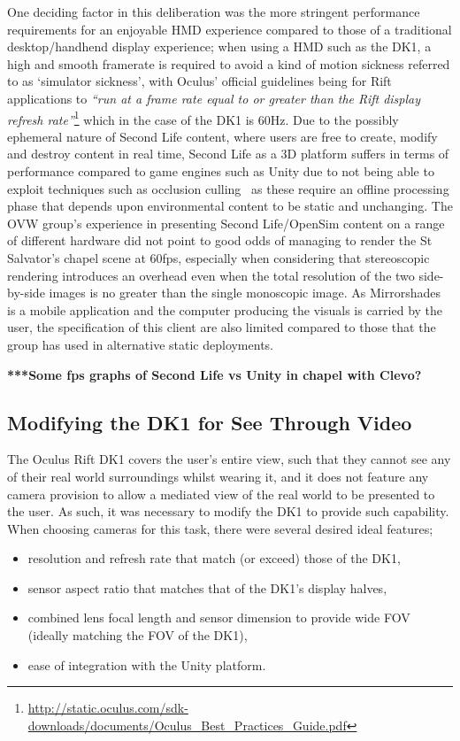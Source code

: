 One deciding factor in this deliberation was the more stringent performance requirements for an enjoyable HMD experience compared to those of a traditional desktop/handhend display experience; when using a HMD such as the DK1, a high and smooth framerate is required to avoid a kind of motion sickness referred to as `simulator sickness', with Oculus' official guidelines being for Rift applications to \textit{``run at a frame rate equal to or greater than the Rift display refresh rate''}\footnote{\url{http://static.oculus.com/sdk-downloads/documents/Oculus_Best_Practices_Guide.pdf}} which in the case of the DK1 is 60Hz. Due to the possibly ephemeral nature of Second Life content, where users are free to create, modify and destroy content in real time, Second Life as a 3D platform suffers in terms of performance compared to game engines such as Unity due to not being able to exploit techniques such as occlusion culling~\cite{willmott:largecomplex} as these require an offline processing phase that depends upon environmental content to be static and unchanging. The OVW group's experience in presenting Second Life/OpenSim content on a range of different hardware did not point to good odds of managing to render the St Salvator's chapel scene at 60fps, especially when considering that stereoscopic rendering introduces an overhead even when the total resolution of the two side-by-side images is no greater than the single monoscopic image. As Mirrorshades is a mobile application and the computer producing the visuals is carried by the user, the specification of this client are also limited compared to those that the group has used in alternative static deployments.

\textbf{***Some fps graphs of Second Life vs Unity in chapel with Clevo?}


\subsection{Modifying the DK1 for See Through Video}
\label{modifying-dk1}
The Oculus Rift DK1 covers the user's entire view, such that they cannot see any of their real world surroundings whilst wearing it, and it does not feature any camera provision to allow a mediated view of the real world to be presented to the user. As such, it was necessary to modify the DK1 to provide such capability. When choosing cameras for this task, there were several desired ideal features;
\begin{itemize}
	\item resolution and refresh rate that match (or exceed) those of the DK1,
	\item sensor aspect ratio that matches that of the DK1's display halves,
	\item combined lens focal length and sensor dimension to provide wide FOV (ideally matching the FOV of the DK1),
	\item ease of integration with the Unity platform.
\end{itemize}

